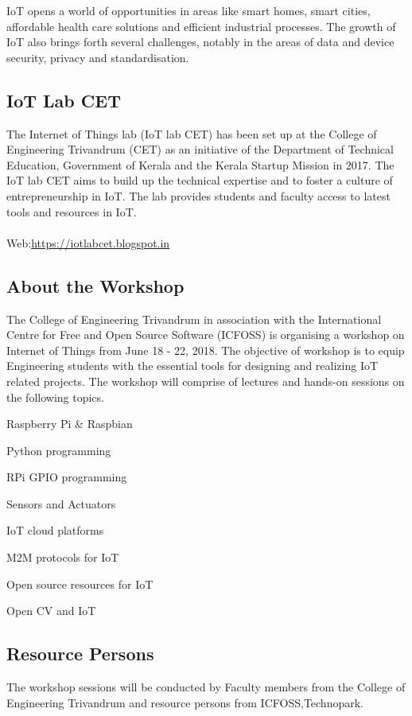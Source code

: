 \documentclass[notumble,10pt,a4paper]{leaflet}
\begin{document}
IoT opens a world of opportunities in areas like smart homes, smart cities, affordable health care solutions and efficient industrial processes. The growth of IoT also brings forth several challenges, notably in the areas of data and device security, privacy and standardisation.  

\subsection{\large{IoT Lab CET}}
The Internet of Things lab (IoT lab CET) has been set up at the College of Engineering Trivandrum (CET) as an initiative of the Department of Technical Education, Government of Kerala and the Kerala Startup Mission in 2017. The IoT lab CET aims to build up the technical expertise and to foster a culture of entrepreneurship in IoT. The lab provides students and faculty access to latest tools and resources in IoT.\\
\\
Web:\url{https://iotlabcet.blogspot.in}


 
\newpage
\subsection{\large{About the Workshop}}
The College of Engineering Trivandrum in association with the International Centre for Free and Open Source Software (ICFOSS) is organising a workshop on Internet of Things from June 18 - 22, 2018. The objective of workshop is to equip  Engineering students with the essential tools for designing and realizing IoT related projects. The workshop will comprise of lectures and hands-on sessions on the following topics.


\begin{itemize*} %
	\item Raspberry Pi \& Raspbian
	\item Python programming
	\item RPi GPIO programming
	\item Sensors and Actuators
	\item IoT cloud platforms
	\item M2M protocols for IoT
	\item Open source resources for IoT 
	\item Open CV and IoT
\end{itemize*}

\subsection{\large{Resource Persons}}
The workshop sessions will be conducted by Faculty members from the College of Engineering Trivandrum and resource persons from ICFOSS,Technopark.
\end{document}
